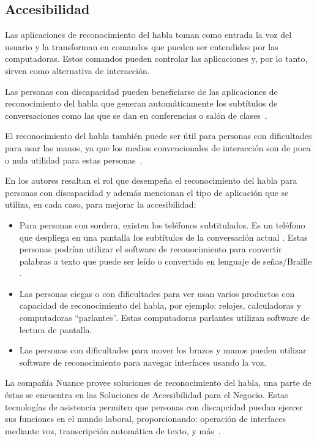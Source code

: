\subsection{Accesibilidad}
\label{sec:accesibilidad}

Las aplicaciones de reconocimiento del habla toman como entrada la voz del usuario y la transforman en
comandos que pueden ser entendidos por las computadoras. Estos comandos pueden controlar las aplicaciones
y, por lo tanto, sirven como alternativa de interacci\'on.

Las personas con discapacidad pueden beneficiarse de las aplicaciones de reconocimiento del habla que
generan autom\'aticamente los subt\'itulos de conversaciones como las que se dan en conferencias o
sal\'on de \mbox{clases \cite{LeitchHow2002}.}

El reconocimiento del habla tambi\'en puede ser \'util para personas con dificultades para usar las manos, ya
que los medios convencionales de interacci\'on son de poca o nula utilidad para estas
\mbox{personas \cite{AnanthiSurvey2013}.}

En \cite{AnanthiSurvey2013} los autores resaltan el rol que desempe\~na el reconocimiento del habla para personas
con discapacidad y adem\'as mencionan el tipo de aplicaci\'on que se utiliza, en cada caso, para mejorar la accesibilidad:

\begin{itemize}
    \item Para personas con sordera, existen los tel\'efonos subtitulados. Es un tel\'efono que despliega en
	una pantalla los subt\'itulos de la conversaci\'on actual \cite{PerfettiReading2000}. Estas personas
	podr\'ian utilizar el software de reconocimiento para convertir palabras a texto que puede ser le\'ido o
	convertido en lenguaje de se\~nas/Braille \cite{SchilperoordNonverbatim2005}.
    \item Las personas ciegas o con dificultades para ver usan varios productos con capacidad de reconocimiento del habla,
	por ejemplo: relojes, calculadoras y computadoras ``parlantes''. Estas computadoras parlantes utilizan software
	de lectura de pantalla.
    \item Las personas con dificultades para mover los brazos y manos pueden utilizar software de reconocimiento para
	navegar interfaces usando la voz\cite{AnanthiSurvey2013}.
\end{itemize}

La compa\~n\'ia Nuance provee soluciones de reconocimiento del habla, una parte de \'estas se encuentra en las Soluciones de Accesibilidad
para el Negocio. Estas tecnolog\'ias de asistencia permiten que personas con discapcidad puedan ejercer sus funciones en el mundo laboral,
proporcionando: operaci\'on de interfaces mediante voz, transcripci\'on autom\'atica de texto,
y \mbox{m\'as \cite{NuanceAccessibility}.}
